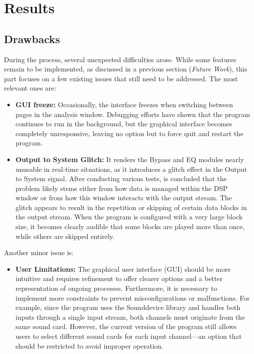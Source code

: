 \chapter{Results}


\section{Drawbacks}

During the process, several unexpected difficulties arose. While some features remain to be implemented, as discussed in a previous section (\textit{Future Work}), this part focuses on a few existing issues that still need to be addressed. The most relevant ones are:

\begin{itemize}
	\item \textbf{GUI freeze:} Occasionally, the interface freezes when switching between pages in the analysis window. Debugging efforts have shown that the program continues to run in the background, but the graphical interface becomes completely unresponsive, leaving no option but to force quit and restart the program.
	
	\item \textbf{Output to System Glitch:} It renders the Bypass and EQ modules nearly unusable in real-time situations, as it introduces a glitch effect in the Output to System signal. After conducting various tests, is concluded that the problem likely stems either from how data is managed within the DSP window or from how this window interacts with the output stream. The glitch appears to result in the repetition or skipping of certain data blocks in the output stream. When the program is configured with a very large block size, it becomes clearly audible that some blocks are played more than once, while others are skipped entirely.
\end{itemize}

Another minor issue is:

\begin{itemize}
	
	\item \textbf{User Limitations:} The graphical user interface (GUI) should be more intuitive and requires refinement to offer clearer options and a better representation of ongoing processes. Furthermore, it is necessary to implement more constraints to prevent misconfigurations or malfunctions. For example, since the program uses the Sounddevice library and handles both inputs through a single input stream, both channels must originate from the same sound card. However, the current version of the program still allows users to select different sound cards for each input channel—an option that should be restricted to avoid improper operation.
		
\end{itemize}

